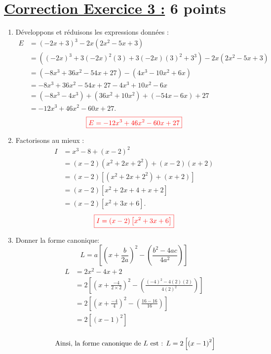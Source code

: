 \documentclass[12pt,a4paper]{article}
\begin{document}
\section*{\underline{Correction Exercice 3 :} 6 points}
\begin{enumerate}
\item Développons et réduisons les expressions données :
\begin{align*}
E &= (-2x + 3)^3 - 2x(2x^2 - 5x + 3) \\ 
  &= \left((-2x)^3 + 3(-2x)^2(3) + 3(-2x)(3)^2 + 3^3\right) - 2x(2x^2 - 5x + 3) \\ 
  &= \left(-8x^3 + 36x^2 - 54x + 27\right) - \left(4x^3 - 10x^2 + 6x\right) \\ 
  &= -8x^3 + 36x^2 - 54x + 27 - 4x^3 + 10x^2 - 6x \\ 
  &= (-8x^3 - 4x^3) + (36x^2 + 10x^2) + (-54x - 6x) + 27 \\ 
  &= -12x^3 + 46x^2 - 60x + 27.
\end{align*}
$$\textcolor{red}{\boxed{E=-12x^3 + 46x^2 - 60x + 27}}$$

\item Factorisons au mieux :
\begin{align*}
I &= x^3 - 8 + (x - 2)^2 \\ 
  &= (x - 2)(x^2 + 2x + 2^2) + (x - 2)(x + 2) \\ 
  &= (x - 2)\left[(x^2 + 2x + 2^2) + (x + 2)\right] \\ 
  &= (x - 2)\left[x^2 + 2x + 4 + x + 2\right] \\ 
  &= (x - 2)\left[x^2 + 3x + 6\right].
\end{align*}
$$\textcolor{red}{\boxed{I=(x - 2)\left[x^2 + 3x + 6\right]}}$$
\item Donner la forme canonique:
\[
L=a\left[\left(x + \frac{b}{2a} \right)^{2} - \left( \frac{b^{2}-4ac}{4a^{2}}\right) \right] 
\]
\begin{align*}
L &= 2x^2 - 4x + 2 \\
  &= 2\left[\left(x + \frac{-4}{2\times 2} \right)^{2} - \left( \frac{(-4)^{2}-4(2)(2)}{4(2)^{2}}\right) \right]  \\
  &= 2\left[\left(x + \frac{-4}{4} \right)^{2} - \left( \frac{16-16}{16}\right) \right]  \\
  &= 2\left[\left(x - 1 \right)^{2} \right]  \\
\end{align*}

\[
\text{ Ainsi, la forme canonique de \( L \) est : }
L = 2\left[\left(x - 1 \right)^{2} \right]
\]


\end{enumerate}
\end{document}
